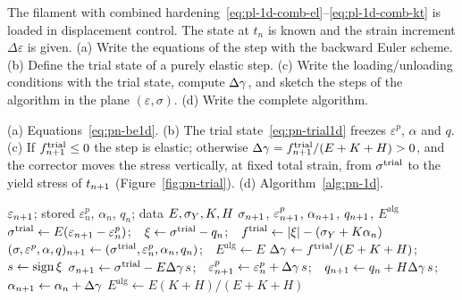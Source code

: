 \label{exo:pn-filament}
%
The filament with combined hardening~\eqref{eq:pl-1d-comb-el}--\eqref{eq:pl-1d-comb-kt}
is loaded in displacement control. The state at $t_n$ is known and the strain
increment $\Delta\varepsilon$ is given. (a) Write the equations of the step
with the backward Euler scheme. (b) Define the trial state of a purely elastic
step. (c) Write the loading/unloading conditions with the trial state, compute
$\Delta\gamma$, and sketch the steps of the algorithm in the plane $(\varepsilon,\sigma)$.
(d) Write the complete algorithm.
\begin{solution}
(a) Equations~\eqref{eq:pn-be1d}. (b) The trial state~\eqref{eq:pn-trial1d}
freezes $\varepsilon^p$, $\alpha$ and $q$. (c) If $f^{\mathrm{trial}}_{n+1}\le0$ the step
is elastic; otherwise $\Delta\gamma=f^{\mathrm{trial}}_{n+1}/(E+K+H)>0$, and the corrector moves
the stress vertically, at fixed total strain, from $\sigma^{\mathrm{trial}}$ to the
yield stress of $t_{n+1}$ (Figure~\ref{fig:pn-trial}). (d) Algorithm~\ref{alg:pn-1d}.
\begin{algorithm}[H]
\caption{Return map for the filament}\label{alg:pn-1d}
\begin{algorithmic}[1]
\Require $\varepsilon_{n+1}$; stored $\varepsilon^p_n$, $\alpha_n$, $q_n$; data $E,\sigma_{Y},K,H$
\Ensure $\sigma_{n+1}$, $\varepsilon^p_{n+1}$, $\alpha_{n+1}$, $q_{n+1}$, $E^{\mathrm{alg}}$
\State $\sigma^{\mathrm{trial}}\gets E(\varepsilon_{n+1}-\varepsilon^p_n)$;\ \ $\xi\gets\sigma^{\mathrm{trial}}-q_n$;\ \ $f^{\mathrm{trial}}\gets|\xi|-(\sigma_{Y}+K\alpha_n)$
  \State $(\sigma,\varepsilon^p,\alpha,q)_{n+1}\gets(\sigma^{\mathrm{trial}},\varepsilon^p_n,\alpha_n,q_n)$;\ \ $E^{\mathrm{alg}}\gets E$ 
\Else
  \State $\Delta\gamma\gets f^{\mathrm{trial}}/(E+K+H)$;\ \ $s\gets\operatorname{sign}\xi$ 
  \State $\sigma_{n+1}\gets\sigma^{\mathrm{trial}}-E\Delta\gamma\,s$;\ \ $\varepsilon^p_{n+1}\gets\varepsilon^p_n+\Delta\gamma\,s$;\ \ $q_{n+1}\gets q_n+H\Delta\gamma\,s$;\ \ $\alpha_{n+1}\gets\alpha_n+\Delta\gamma$
  \State $E^{\mathrm{alg}}\gets E(K+H)/(E+K+H)$
\EndIf
\end{algorithmic}
\end{algorithm}
\end{solution}

